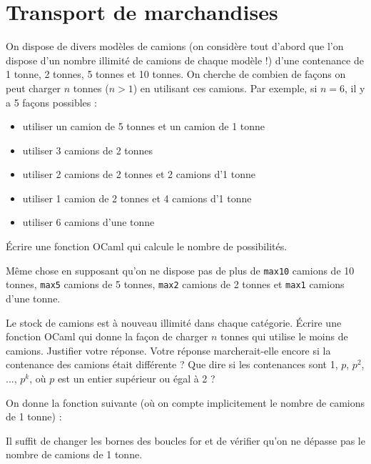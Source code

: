 \renewcommand{\SourceFile}{3-strategies-gloutonnes/src/3-4.ml}

\section{Transport de marchandises}

On dispose de divers modèles de camions (on considère tout d'abord que l'on dispose d'un nombre illimité de camions de chaque modèle !) d'une contenance de 1 tonne, 2 tonnes, 5 tonnes et 10 tonnes. On cherche de combien de façons on peut charger $n$ tonnes ($n > 1$) en utilisant ces camions. Par exemple, si $n=6$, il y a 5 façons possibles :
\begin{itemize}
    \item utiliser un camion de 5 tonnes et un camion de 1 tonne
    \item utiliser 3 camions de 2 tonnes
    \item utiliser 2 camions de 2 tonnes et 2 camions d'1 tonne
    \item utiliser 1 camion de 2 tonnes et 4 camions d'1 tonne
    \item utiliser 6 camions d'une tonne
\end{itemize}

\Q
Écrire une fonction OCaml qui calcule le nombre de possibilités.

\Q
Même chose en supposant qu'on ne dispose pas de plus de \texttt{max10} camions de 10 tonnes, \texttt{max5} camions de 5 tonnes, \texttt{max2} camions de 2 tonnes et \texttt{max1} camions d'une tonne.

\Q
Le stock de camions est à nouveau illimité dans chaque catégorie. Écrire une fonction OCaml qui donne la façon de charger $n$ tonnes qui utilise le moins de camions. Justifier votre réponse. Votre réponse marcherait-elle encore si la contenance des camions était différente ? Que dire si les contenances sont 1, $p$, $p^2$, ..., $p^k$, où $p$ est un entier supérieur ou égal à 2 ?

\Corrige

\Q
On donne la fonction suivante (où on compte implicitement le nombre de camions de 1 tonne) :



\Q
Il suffit de changer les bornes des boucles \og for \fg{} et de vérifier qu'on ne dépasse pas le nombre de camions de 1 tonne.



